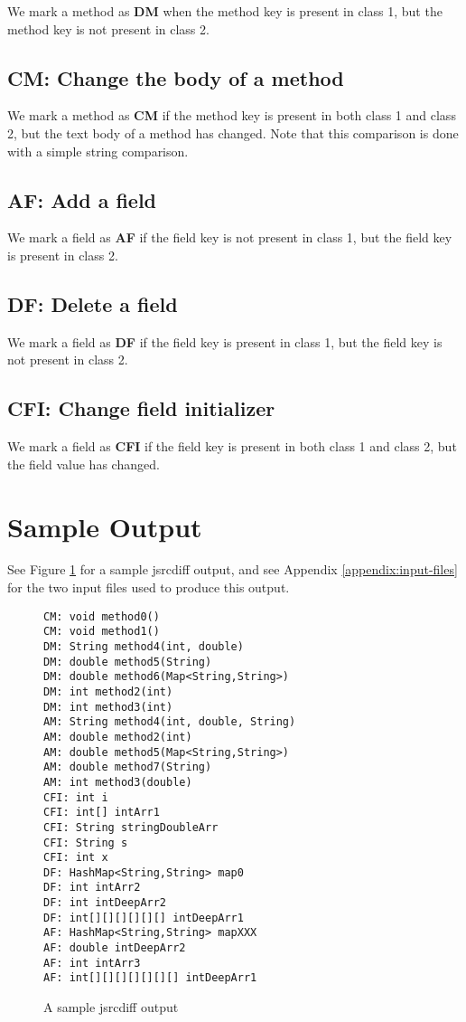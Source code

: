 We mark a method as \textbf{DM} when the method key is present in class 1, but
the method key is not present in class 2.

\subsection{CM: Change the body of a method}

We mark a method as \textbf{CM} if the method key is present in both class 1
and class 2, but the text body of a method has changed.
Note that this comparison is done with a simple string comparison.

\subsection{AF: Add a field}

We mark a field as \textbf{AF} if the field key is not present in class 1,
but the field key is present in class 2.

\subsection{DF: Delete a field}

We mark a field as \textbf{DF} if the field key is present in class 1, but the
field key is not present in class 2.

\subsection{CFI: Change field initializer}

We mark a field as \textbf{CFI} if the field key is present in both class 1
and class 2, but the field value has changed.

\section{Sample Output}

See Figure \ref{figure:sample-output} for a sample jsrcdiff output, and
see Appendix \ref{appendix:input-files} for the two input files used to
produce this output.

\begin{figure}
\centering
\begin{lstlisting}[frame=single]
CM: void method0()
CM: void method1()
DM: String method4(int, double)
DM: double method5(String)
DM: double method6(Map<String,String>)
DM: int method2(int)
DM: int method3(int)
AM: String method4(int, double, String)
AM: double method2(int)
AM: double method5(Map<String,String>)
AM: double method7(String)
AM: int method3(double)
CFI: int i
CFI: int[] intArr1
CFI: String stringDoubleArr
CFI: String s
CFI: int x
DF: HashMap<String,String> map0
DF: int intArr2
DF: int intDeepArr2
DF: int[][][][][][] intDeepArr1
AF: HashMap<String,String> mapXXX
AF: double intDeepArr2
AF: int intArr3
AF: int[][][][][][][] intDeepArr1
\end{lstlisting}
\caption{A sample jsrcdiff output}
\label{figure:sample-output}
\end{figure}
